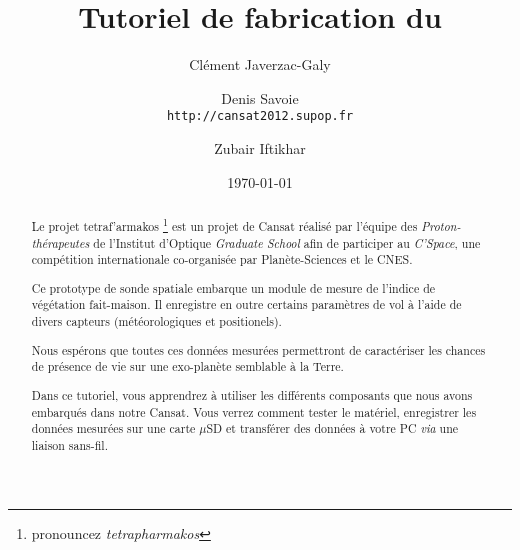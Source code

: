 \documentclass[twocolumn,landscape, 8pt]{article}
\title{Tutoriel de fabrication du \tet}
\author{Clément Javerzac-Galy \and{Denis Savoie}\\
\texttt{http://cansat2012.supop.fr}
\and{Zubair Iftikhar}
}
\date{\today}
\newcommand\tet{\textgreek{tetraf'armakos} }
\begin{document}
\maketitle

\begin{abstract}
    \begin{bfseries}
	    \par \small Le projet \tet \footnote{pronouncez \textit{tetrapharmakos}} est un projet de Cansat réalisé par l'équipe des \textit{Proton-thérapeutes} de l'Institut d'Optique \textit{Graduate School} afin de participer au \textit{C'Space}, une compétition internationale co-organisée par Planète-Sciences et le CNES. 
	    \par \small Ce prototype de sonde spatiale embarque un module de mesure de l'indice de végétation fait-maison. Il enregistre en outre certains paramètres de vol à l'aide de divers capteurs (météorologiques et positionels).
    \par \small Nous espérons que toutes ces données mesurées permettront de caractériser les chances de présence de vie sur une exo-planète semblable à la Terre.
    \par \small Dans ce tutoriel, vous apprendrez à utiliser les différents composants que nous avons embarqués dans notre Cansat. Vous verrez comment tester le matériel, enregistrer les données mesurées sur une carte $\mu$SD et transférer des données à votre PC \textit{via} une liaison sans-fil.
     \end{bfseries}
\end{abstract}
\end{document}
